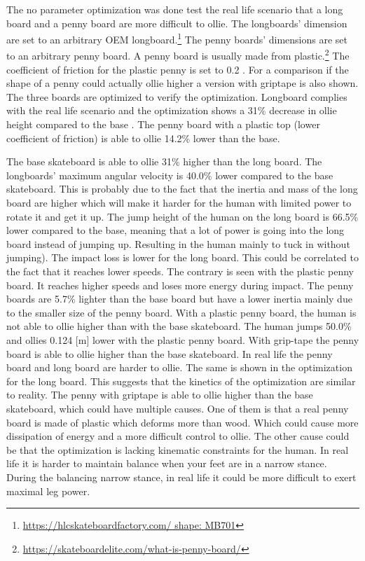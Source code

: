 \noindent The no parameter optimization was done test the real life scenario that a long board and a penny board are more difficult to ollie. The longboards' dimension are set to an arbitrary OEM longboard.\footnote{\url{https://hlcskateboardfactory.com/ shape: MB701}} The penny boards' dimensions are set to an arbitrary penny board. A penny board is usually made from plastic.\footnote{\url{https://skateboardelite.com/what-is-penny-board/}} The coefficient of friction for the plastic penny is set to 0.2 \cite{bani-hani_data_2019}. For a comparison if the shape of a penny could actually ollie higher a version with griptape is also shown. The three boards are optimized to verify the optimization. Longboard complies with the real life scenario and the optimization shows a 31\% decrease in ollie height compared to the base . The penny board with a plastic top (lower coefficient of friction) is able to ollie 14.2\% lower than the base.

The base skateboard is able to ollie 31\% higher than the long board. The longboards' maximum angular velocity is 40.0\% lower compared to the base skateboard. This is probably due to the fact that the inertia and mass of the long board are higher which will make it harder for the human with limited power to rotate it and get it up. The jump height of the human on the long board is 66.5\% lower compared to the base, meaning that a lot of power is going into the long board instead of jumping up. Resulting in the human mainly to tuck in without jumping). The impact loss is lower for the long board. This could be correlated to the fact that it reaches lower speeds. The contrary is seen with the plastic penny board. It reaches higher speeds and loses more energy during impact. The penny boards are 5.7\% lighter than the base board but have a lower inertia mainly due to the smaller size of the penny board. With a plastic penny board, the human is not able to ollie higher than with the base skateboard. The human jumps 50.0\% and ollies 0.124 [m] lower with the plastic penny board. With grip-tape the penny board is able to ollie higher than the base skateboard. In real life the penny board and long board are harder to ollie. The same is shown in the optimization for the long board. This suggests that the kinetics of the optimization are similar to reality. The penny with griptape is able to ollie higher than the base skateboard, which could have multiple causes. One of them is that a real penny board is made of plastic which deforms more than wood. Which could cause more dissipation of energy and a more difficult control to ollie. The other cause could be that the optimization is lacking kinematic constraints for the human. In real life it is harder to maintain balance when your feet are in a narrow stance. During the balancing narrow stance, in real life it could be more difficult to exert maximal leg power.

